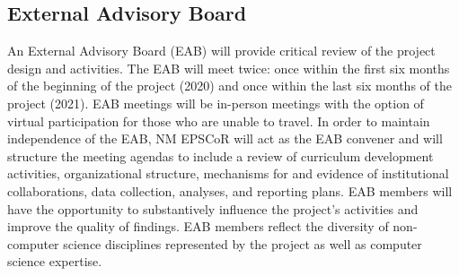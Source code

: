\subsection{External Advisory Board}
An External Advisory Board (EAB) will provide critical review of the project design and activities. The EAB will meet twice: once within the first six months of the beginning of the project (2020) and once within the last six months of the project (2021). EAB meetings will be in-person meetings with the option of virtual participation for those who are unable to travel. In order to maintain independence of the EAB, NM EPSCoR will act as the EAB convener and will structure the meeting agendas to include a review of curriculum development activities, organizational structure, mechanisms for and evidence of institutional collaborations, data collection, analyses, and reporting plans. EAB members will have the opportunity to substantively influence the project’s activities and improve the quality of findings. EAB members reflect the diversity of non-computer science disciplines represented by the project as well as computer science expertise.
